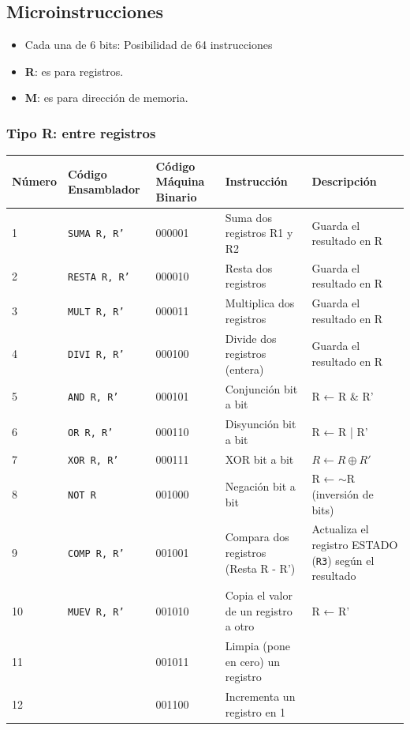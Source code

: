 \documentclass{article}
\begin{document}
\subsection{Microinstrucciones}

\begin{itemize}
    \item Cada una de 6 bits: Posibilidad de 64 instrucciones
    \item \textbf{R}: es para registros.
    \item \textbf{M}: es para dirección de memoria.
\end{itemize}

\subsubsection{Tipo R: \textbf{entre registros}}

\begin{table}[H]
    \centering
    \begin{tabular}{|p{1.3cm}|p{3cm}|p{1.6cm}|p{5cm}|p{4cm}|}
    \hline
    \textbf{Número} & \textbf{Código Ensamblador} & \textbf{Código Máquina Binario} & \textbf{Instrucción} & \textbf{Descripción} \\
    \hline
    1  & \texttt{SUMA R, R'} & 000001 & Suma dos registros R1 y R2 & Guarda el resultado en R \\
    \hline
    2  & \texttt{RESTA R, R'} & 000010 & Resta dos registros & Guarda el resultado en R \\
    \hline
    3  & \texttt{MULT R, R'} & 000011 & Multiplica dos registros & Guarda el resultado en R \\
    \hline
    4  & \texttt{DIVI R, R'} & 000100 & Divide dos registros (entera) & Guarda el resultado en R \\
    \hline
    5  & \texttt{AND R, R'} & 000101 & Conjunción bit a bit & R ← R \& R' \\
    \hline
    6  & \texttt{OR R, R'} & 000110 & Disyunción bit a bit & R ← R | R' \\
    \hline
    7  & \texttt{XOR R, R'} & 000111 & XOR bit a bit & $R \leftarrow R \oplus R'$ \\
    \hline
    8  & \texttt{NOT R} & 001000 & Negación bit a bit & R ← $\sim$R (inversión de bits) \\
    \hline
    9  & \texttt{COMP R, R'} & 001001 & Compara dos registros (Resta R - R') & Actualiza el registro ESTADO (\texttt{R3}) según el resultado \\
    \hline
    10 & \texttt{MUEV R, R'} & 001010 & Copia el valor de un registro a otro & R ← R' \\
    \hline
    11 & & 001011 & Limpia (pone en cero) un registro & \\
    \hline
    12 & & 001100 & Incrementa un registro en 1 & \\
    \hline
    \end{tabular}
\end{table}
\end{document}
